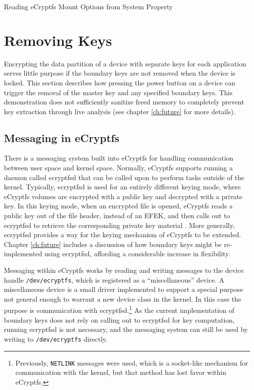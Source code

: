 \begin{table}[!htb] 

\caption{Reading eCryptfs Mount Options from System Property} 
\label{tab:init-ecryptfs-mount}
\end{table}

\section{Removing Keys}

Encrypting the data partition of a device with separate keys for each application serves little purpose if the
boundary keys are not removed when the device is locked. This section describes how pressing the power button on a device can
trigger the removal of the master key and any specified boundary keys. This demonstration does not sufficiently sanitize freed
memory to completely prevent key extraction through live analysis (see chapter \ref{ch:future} for more details).

\subsection{Messaging in eCryptfs}
 
There is a messaging system built into eCryptfs for handling communication between user space and kernel space. Normally, eCryptfs
supports running a daemon called ecryptfsd that can be called upon to perform tasks outside of the kernel.  Typically,
ecryptfsd is used for an entirely different keying mode, where eCryptfs volumes are encrypted with a public key and
decrypted with a private key.  In this keying mode, when an encrypted file is opened, eCryptfs reads a public key out of the file
header, instead of an EFEK, and then calls out to ecryptfsd to retrieve the corresponding private key material \cite{ecryptfspki}. More
generally, ecryptfsd provides a way for the keying mechanism of eCryptfs to be extended.  Chapter \ref{ch:future} includes
a discussion of how boundary keys might be re-implemented using ecryptfsd, affording a considerable increase in
flexibility.

Messaging within eCryptfs works by reading and writing messages to the device handle \texttt{/dev/ecryptfs}, which is registered as
a ``miscellaneous'' device. A miscellaneous device is a small driver implemented to support a special purpose not general enough to
warrant a new device class in the kernel. In this case the purpose is communication with ecryptfsd.\footnote{Previously,
\texttt{NETLINK} messages were used, which is a socket-like mechanism for communication with the kernel, but that method has lost
favor within eCryptfs.} As the current implementation of boundary keys does not rely on calling out to ecryptfsd for key
computation, running ecryptfsd is not necessary, and the messaging system can still be used by writing to
\texttt{/dev/ecryptfs} directly. 

